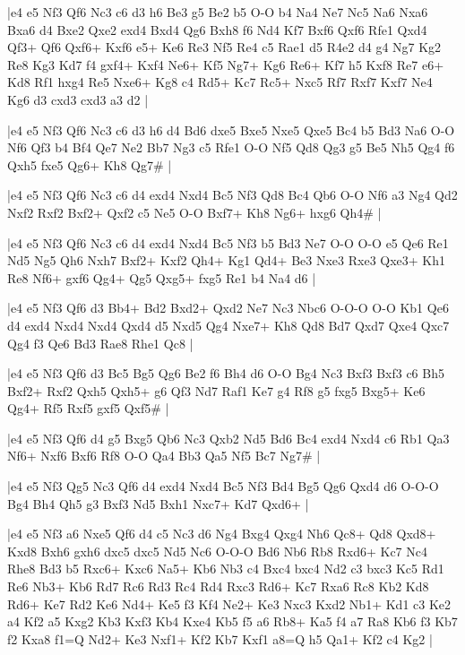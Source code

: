 \whitename{}
\blackname{}
\makegametitle
|e4 e5 Nf3 Qf6 Nc3 c6 d3 h6 Be3 g5 Be2 b5 O-O b4 Na4 Ne7 Nc5 Na6 Nxa6 Bxa6 d4 Bxe2 Qxe2 exd4 Bxd4 Qg6 Bxh8 f6 Nd4 Kf7 Bxf6 Qxf6 Rfe1 Qxd4 Qf3+ Qf6 Qxf6+ Kxf6 e5+ Ke6 Re3 Nf5 Re4 c5 Rae1 d5 R4e2 d4 g4 Ng7 Kg2 Re8 Kg3 Kd7 f4 gxf4+ Kxf4 Ne6+ Kf5 Ng7+ Kg6 Re6+ Kf7 h5 Kxf8 Re7 e6+ Kd8 Rf1 hxg4 Re5 Nxe6+ Kg8 c4 Rd5+ Kc7 Rc5+ Nxc5 Rf7 Rxf7 Kxf7 Ne4 Kg6 d3 cxd3 cxd3 a3 d2  |

\whitename{}
\blackname{}
\makegametitle
|e4 e5 Nf3 Qf6 Nc3 c6 d3 h6 d4 Bd6 dxe5 Bxe5 Nxe5 Qxe5 Bc4 b5 Bd3 Na6 O-O Nf6 Qf3 b4 Bf4 Qe7 Ne2 Bb7 Ng3 c5 Rfe1 O-O Nf5 Qd8 Qg3 g5 Be5 Nh5 Qg4 f6 Qxh5 fxe5 Qg6+ Kh8 Qg7\#  |

\whitename{}
\blackname{}
\makegametitle
|e4 e5 Nf3 Qf6 Nc3 c6 d4 exd4 Nxd4 Bc5 Nf3 Qd8 Bc4 Qb6 O-O Nf6 a3 Ng4 Qd2 Nxf2 Rxf2 Bxf2+ Qxf2 c5 Ne5 O-O Bxf7+ Kh8 Ng6+ hxg6 Qh4\#  |

\whitename{}
\blackname{}
\makegametitle
|e4 e5 Nf3 Qf6 Nc3 c6 d4 exd4 Nxd4 Bc5 Nf3 b5 Bd3 Ne7 O-O O-O e5 Qe6 Re1 Nd5 Ng5 Qh6 Nxh7 Bxf2+ Kxf2 Qh4+ Kg1 Qd4+ Be3 Nxe3 Rxe3 Qxe3+ Kh1 Re8 Nf6+ gxf6 Qg4+ Qg5 Qxg5+ fxg5 Re1 b4 Na4 d6  |

\whitename{}
\blackname{}
\makegametitle
|e4 e5 Nf3 Qf6 d3 Bb4+ Bd2 Bxd2+ Qxd2 Ne7 Nc3 Nbc6 O-O-O O-O Kb1 Qe6 d4 exd4 Nxd4 Nxd4 Qxd4 d5 Nxd5 Qg4 Nxe7+ Kh8 Qd8 Bd7 Qxd7 Qxe4 Qxc7 Qg4 f3 Qe6 Bd3 Rae8 Rhe1 Qc8  |

\whitename{}
\blackname{}
\makegametitle
|e4 e5 Nf3 Qf6 d3 Bc5 Bg5 Qg6 Be2 f6 Bh4 d6 O-O Bg4 Nc3 Bxf3 Bxf3 c6 Bh5 Bxf2+ Rxf2 Qxh5 Qxh5+ g6 Qf3 Nd7 Raf1 Ke7 g4 Rf8 g5 fxg5 Bxg5+ Ke6 Qg4+ Rf5 Rxf5 gxf5 Qxf5\#  |

\whitename{}
\blackname{}
\makegametitle
|e4 e5 Nf3 Qf6 d4 g5 Bxg5 Qb6 Nc3 Qxb2 Nd5 Bd6 Bc4 exd4 Nxd4 c6 Rb1 Qa3 Nf6+ Nxf6 Bxf6 Rf8 O-O Qa4 Bb3 Qa5 Nf5 Bc7 Ng7\#  |

\whitename{}
\blackname{}
\makegametitle
|e4 e5 Nf3 Qg5 Nc3 Qf6 d4 exd4 Nxd4 Bc5 Nf3 Bd4 Bg5 Qg6 Qxd4 d6 O-O-O Bg4 Bh4 Qh5 g3 Bxf3 Nd5 Bxh1 Nxc7+ Kd7 Qxd6+  |

\whitename{}
\blackname{}
\makegametitle
|e4 e5 Nf3 a6 Nxe5 Qf6 d4 c5 Nc3 d6 Ng4 Bxg4 Qxg4 Nh6 Qc8+ Qd8 Qxd8+ Kxd8 Bxh6 gxh6 dxc5 dxc5 Nd5 Nc6 O-O-O Bd6 Nb6 Rb8 Rxd6+ Kc7 Nc4 Rhe8 Bd3 b5 Rxc6+ Kxc6 Na5+ Kb6 Nb3 c4 Bxc4 bxc4 Nd2 c3 bxc3 Kc5 Rd1 Re6 Nb3+ Kb6 Rd7 Rc6 Rd3 Rc4 Rd4 Rxc3 Rd6+ Kc7 Rxa6 Rc8 Kb2 Kd8 Rd6+ Ke7 Rd2 Ke6 Nd4+ Ke5 f3 Kf4 Ne2+ Ke3 Nxc3 Kxd2 Nb1+ Kd1 c3 Ke2 a4 Kf2 a5 Kxg2 Kb3 Kxf3 Kb4 Kxe4 Kb5 f5 a6 Rb8+ Ka5 f4 a7 Ra8 Kb6 f3 Kb7 f2 Kxa8 f1=Q Nd2+ Ke3 Nxf1+ Kf2 Kb7 Kxf1 a8=Q h5 Qa1+ Kf2 c4 Kg2  |

